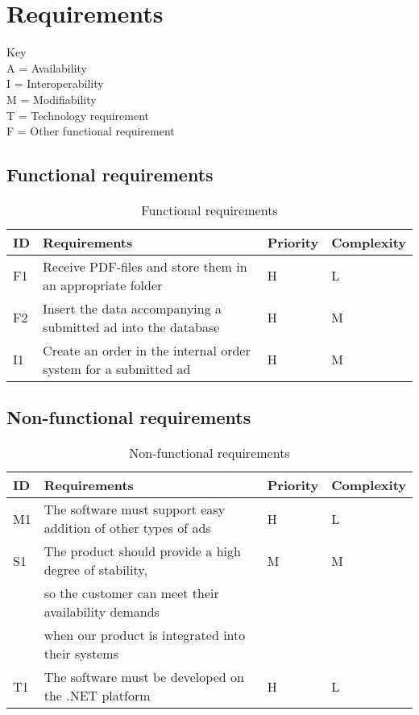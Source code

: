\section{Requirements}

\Large Key \\
\normalsize A = Availability\\
I = Interoperability\\
M = Modifiability\\
T = Technology requirement\\
F = Other functional requirement\\

\subsection{Functional requirements}
 \normalsize
\begin{table}[H]
\begin{tabular}{| l | l | l | l |}
	\hline
	ID & Requirements & Priority & Complexity\\
	\hline
	F1 & Receive PDF-files and store them in an appropriate folder & H & L \\
	\hline
	F2 & Insert the data accompanying a submitted ad into the database & H & M \\
	\hline
	I1 & Create an order in the internal order system for a submitted ad & H & M \\
	\hline
	
\end{tabular}
\caption{Functional requirements}
\end{table}

\subsection{Non-functional requirements} \normalsize
\begin{table}[H]
\begin{tabular}{| l | l | l | l |}
	\hline
	ID & Requirements & Priority & Complexity\\
	\hline
	M1 & The software must support easy addition of other types of ads & H & L \\
	\hline
	S1 & The product should provide a high degree of stability, & M& M \\ 
	&  so the customer can meet their availability demands & & \\
	& when our product is integrated into their systems & &\\
	\hline
	T1 & The software must be developed on the .NET platform & H & L \\
	\hline
	
\end{tabular}
\caption{Non-functional requirements}
\end{table}